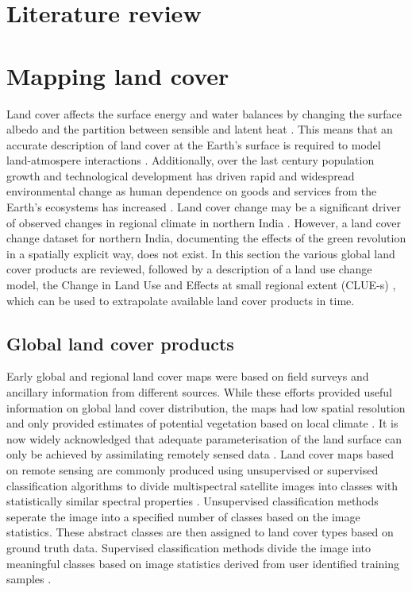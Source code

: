 \documentclass{icldt}\usepackage[]{graphicx}\usepackage[]{color}
\begin{document}
\section{Literature review}

\section{Mapping land cover}

Land cover affects the surface energy and water balances by changing the surface albedo and the partition between sensible and latent heat \citep{Sellers1997,Feddema2005}. This means that an accurate description of land cover at the Earth's surface is required to model land-atmospere interactions \citep{Friedl2002}. Additionally, over the last century population growth and technological development has driven rapid and widespread environmental change as human dependence on goods and services from the Earth's ecosystems has increased \citep{Vitousek1997}. Land cover change may be a significant driver of observed changes in regional climate in northern India \citep[e.g.][]{Goswami2006,Pitman2009,Niyogi2010}. However, a land cover change dataset for northern India, documenting the effects of the green revolution in a spatially explicit way, does not exist. In this section the various global land cover products are reviewed, followed by a description of a land use change model, the Change in Land Use and Effects at small regional extent (CLUE-s) \citep{Verburg2002,Verburg2004}, which can be used to extrapolate available land cover products in time. \\

\subsection{Global land cover products}

Early global and regional land cover maps \citep{Olson1983,Matthews1983,Wilson1985} were based on field surveys and ancillary information from different sources. While these efforts provided useful information on global land cover distribution, the maps had low spatial resolution and only provided estimates of potential vegetation based on local climate \citep{Friedl2002}. It is now widely acknowledged that adequate parameterisation of the land surface can only be achieved by assimilating remotely sensed data \citep{Sellers1997,Friedl2002}. Land cover maps based on remote sensing are commonly produced using unsupervised or supervised classification algorithms to divide multispectral satellite images into classes with statistically similar spectral properties \citep{Nemani1997}. Unsupervised classification methods seperate the image into a specified number of classes based on the image statistics. These abstract classes are then assigned to land cover types based on ground truth data. Supervised classification methods divide the image into meaningful classes based on image statistics derived from user identified training samples \citep{Neteler2008}. \\
\end{document}
